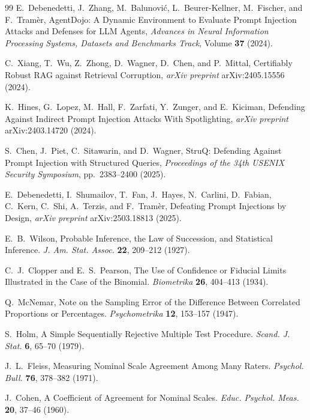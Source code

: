 \documentclass[10pt,letterpaper]{article}
\begin{document}
\begin{thebibliography}{99}
E.~Debenedetti, J.~Zhang, M.~Balunovi\'{c}, L.~Beurer-Kellner, M.~Fischer, and F.~Tram\`{e}r, AgentDojo: A Dynamic
Environment to Evaluate Prompt Injection Attacks and Defenses for LLM Agents, \emph{Advances in Neural Information
Processing Systems, Datasets and Benchmarks Track}, Volume \textbf{37} (2024).

C.~Xiang, T.~Wu, Z.~Zhong, D.~Wagner, D.~Chen, and P.~Mittal, Certifiably Robust RAG against Retrieval Corruption,
\emph{arXiv preprint} arXiv:2405.15556 (2024).

K.~Hines, G.~Lopez, M.~Hall, F.~Zarfati, Y.~Zunger, and E.~Kiciman, Defending Against Indirect Prompt Injection
Attacks With Spotlighting, \emph{arXiv preprint} arXiv:2403.14720 (2024).

S.~Chen, J.~Piet, C.~Sitawarin, and D.~Wagner, StruQ: Defending Against Prompt Injection with Structured Queries,
\emph{Proceedings of the 34th USENIX Security Symposium}, pp.~2383--2400 (2025).

E.~Debenedetti, I.~Shumailov, T.~Fan, J.~Hayes, N.~Carlini, D.~Fabian, C.~Kern, C.~Shi, A.~Terzis, and
F.~Tram\`{e}r, Defeating Prompt Injections by Design, \emph{arXiv preprint} arXiv:2503.18813 (2025).

E.~B.~Wilson, Probable Inference, the Law of Succession, and Statistical Inference. \emph{J. Am. Stat. Assoc.}
\textbf{22}, 209--212 (1927).

C.~J.~Clopper and E.~S.~Pearson, The Use of Confidence or Fiducial Limits Illustrated in the Case of the Binomial.
\emph{Biometrika} \textbf{26}, 404--413 (1934).

Q.~McNemar, Note on the Sampling Error of the Difference Between Correlated Proportions or Percentages.
\emph{Psychometrika} \textbf{12}, 153--157 (1947).

S.~Holm, A Simple Sequentially Rejective Multiple Test Procedure. \emph{Scand. J. Stat.} \textbf{6}, 65--70 (1979).

J.~L.~Fleiss, Measuring Nominal Scale Agreement Among Many Raters. \emph{Psychol. Bull.} \textbf{76}, 378--382
(1971).

J.~Cohen, A Coefficient of Agreement for Nominal Scales. \emph{Educ. Psychol. Meas.} \textbf{20}, 37--46 (1960).

\end{thebibliography}
\end{document}
